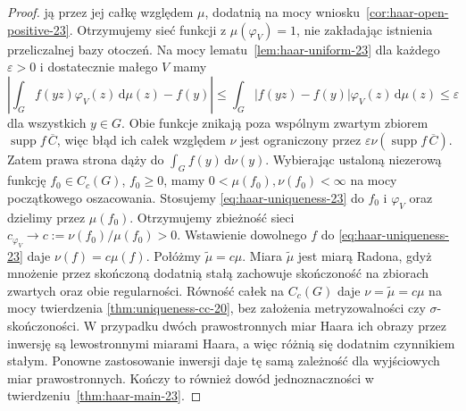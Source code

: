 \begin{proof}
ją przez jej całkę względem $\mu$, dodatnią na mocy
wniosku~\ref{cor:haar-open-positive-23}.
Otrzymujemy sieć funkcji z $\mu(\varphi_V)=1$,
nie zakładając istnienia przeliczalnej bazy otoczeń.
Na mocy lematu~\ref{lem:haar-uniform-23}
dla każdego $\varepsilon>0$ i dostatecznie małego $V$ mamy
\[
 \left|\int_G f(yz)\varphi_V(z)\,\mathrm d\mu(z)-f(y)\right|
 \le\int_G |f(yz)-f(y)|\varphi_V(z)\,\mathrm d\mu(z)
 \le\varepsilon
\]
dla wszystkich $y\in G$. Obie funkcje znikają poza wspólnym
zwartym zbiorem $\operatorname{supp}f\,\overline C$,
więc błąd ich całek względem $\nu$ jest ograniczony przez
$\varepsilon\nu(\operatorname{supp}f\,\overline C)$.
Zatem prawa strona dąży do $\int_Gf(y)\,\mathrm d\nu(y)$.
Wybierając ustaloną niezerową funkcję
$f_0\in C_c(G)$, $f_0\ge0$, mamy
$0<\mu(f_0),\nu(f_0)<\infty$ na mocy początkowego
oszacowania. Stosujemy \eqref{eq:haar-uniqueness-23}
do $f_0$ i $\varphi_V$ oraz dzielimy przez
$\mu(f_0)$. Otrzymujemy zbieżność sieci
$c_{\varphi_V}\to c:=\nu(f_0)/\mu(f_0)>0$.
Wstawienie dowolnego $f$ do
\eqref{eq:haar-uniqueness-23} daje
$\nu(f)=c\mu(f)$. Połóżmy $\widetilde\mu=c\mu$.
Miara $\widetilde\mu$ jest miarą Radona, gdyż
mnożenie przez skończoną dodatnią stałą zachowuje
skończoność na zbiorach zwartych oraz obie regularności.
Równość całek na $C_c(G)$ daje $\nu=\widetilde\mu=c\mu$
na mocy twierdzenia \ref{thm:uniqueness-cc-20},
bez założenia metryzowalności czy $\sigma$-skończoności.
W przypadku dwóch prawostronnych miar
Haara ich obrazy przez inwersję są lewostronnymi miarami
Haara, a więc różnią się dodatnim czynnikiem stałym.
Ponowne zastosowanie inwersji daje tę samą zależność
dla wyjściowych miar prawostronnych. Kończy to również
dowód jednoznaczności w twierdzeniu~\ref{thm:haar-main-23}.
\end{proof}

